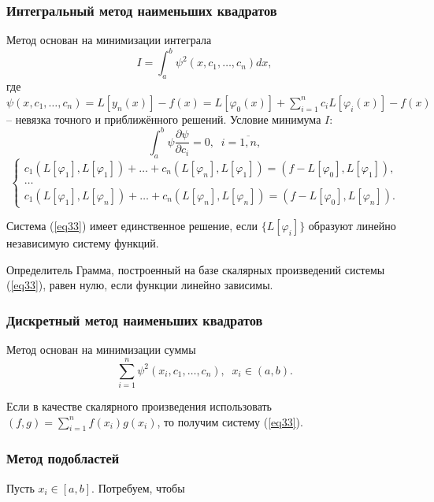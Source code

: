 \documentclass[
11pt,
master, %
subf, %
href, %
colorlinks=true, %
times, %
]{disser}
\begin{document}
\subsubsection{Интегральный метод наименьших квадратов}
Метод основан на минимизации интеграла
\begin{equation}\label{eq32}
I = \int_{a}^{b} \psi^2(x, c_1, \ldots, c_n) dx,
\end{equation}
где $\psi(x, c_1, \ldots, c_n) = L[y_n(x)] - f(x) = L[\varphi_0(x)] + \sum_{i=1}^{n} c_i L[\varphi_i(x)] - f(x)$ -- невязка точного и приближённого решений. Условие минимума $I$:
$$\int_{a}^{b} \psi \frac{\partial \psi}{\partial c_i} = 0, \;\; i = \overline{1,n},$$
\begin{equation}\label{eq33}
\left\{
  \begin{array}{ll}
    c_1(L[\varphi_1], L[\varphi_1]) + \ldots + c_n(L[\varphi_n], L[\varphi_1]) = (f - L[\varphi_0], L[\varphi_1]),\\
    \ldots\\
    c_1(L[\varphi_1], L[\varphi_n]) + \ldots + c_n(L[\varphi_n], L[\varphi_n]) = (f - L[\varphi_0], L[\varphi_n]).
  \end{array}
\right.
\end{equation}

Система (\ref{eq33}) имеет единственное решение, если $\{L[\varphi_i]\}$ образуют линейно независимую систему функций.

Определитель Грамма, построенный на базе скалярных произведений системы (\ref{eq33}), равен нулю, если функции линейно зависимы.
\subsubsection{Дискретный метод наименьших квадратов}

Метод основан на минимизации суммы
\begin{equation}\label{eq34}
\sum_{i=1}^{n} \psi^2(x_i, c_1, \ldots, c_n), \;\; x_i \in (a,b).
\end{equation}

Если в качестве скалярного произведения использовать $(f,g) = \sum_{i=1}^{n} f(x_i)g(x_i)$, то получим систему (\ref{eq33}).

\subsubsection{Метод подобластей}

Пусть $x_i \in [a,b]$. Потребуем, чтобы
\end{document}
